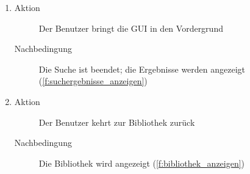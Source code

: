 \begin{enumerate} [label=\bfseries /TSW \arabic*0/, leftmargin=*]
\begin{enumerate}[leftmargin=0pt]
\begin{description}
			\item[Nachbedingung] Es ist ein Signalton zu hören (\ref{fw:signalton})
		\end{description}
		\item
		\begin{description}
			\item[Aktion] Der Benutzer bringt die \gls{GUI} in den Vordergrund
			\item[Nachbedingung] Die Suche ist beendet; die Ergebnisse werden angezeigt (\ref{f:suchergebnisse_anzeigen})
		\end{description}
		\item
		\begin{description}
			\item[Aktion] Der Benutzer kehrt zur Bibliothek zurück
			\item[Nachbedingung] Die Bibliothek wird angezeigt (\ref{f:bibliothek_anzeigen})
		\end{description}


\end{enumerate}
\end{enumerate}

